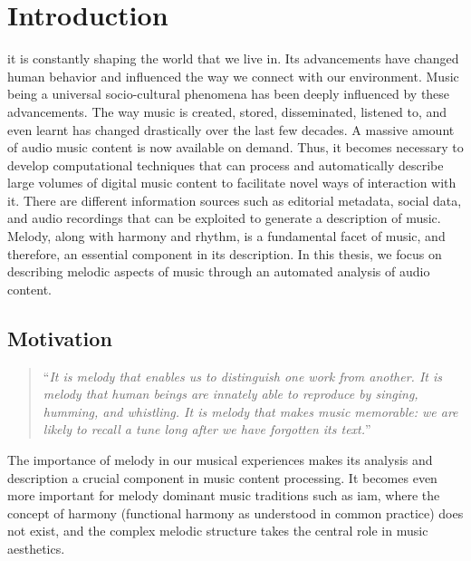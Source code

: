 
\glsresetall

\chapter{Introduction}
\label{chap:intro}


\Gls{it} is constantly shaping the world that we live in. Its advancements have changed human behavior and influenced the way we connect with our environment. Music being a universal socio-cultural phenomena has been deeply influenced by these advancements. The way music is created, stored, disseminated, listened to, and even learnt has changed drastically over the last few decades. A massive amount of audio music content is now available on demand. Thus, it becomes necessary to develop computational techniques that can process and automatically describe large volumes of digital music content to facilitate novel ways of interaction with it. There are different information sources such as editorial metadata, social data, and audio recordings that can be exploited to generate a description of music. Melody, along with harmony and rhythm, is a fundamental facet of music, and therefore, an essential component in its description. In this thesis, we focus on describing melodic aspects of music through an automated analysis of audio content. 

\section{Motivation}
\label{sec:motivation}

\blockcquote[]{selfridge1998conceptual}{``\textit{It is melody that enables us to distinguish one work from another. It is melody that human beings are innately able to reproduce by singing, humming, and whistling. It is melody that makes music memorable: we are likely to recall a tune long after we have forgotten its text.}''}

The importance of melody in our musical experiences makes its analysis and description a crucial component in music content processing. It becomes even more important for melody dominant music traditions such as \gls{iam}, where the concept of harmony (functional harmony as understood in common practice) does not exist, and the complex melodic structure takes the central role in music aesthetics.

